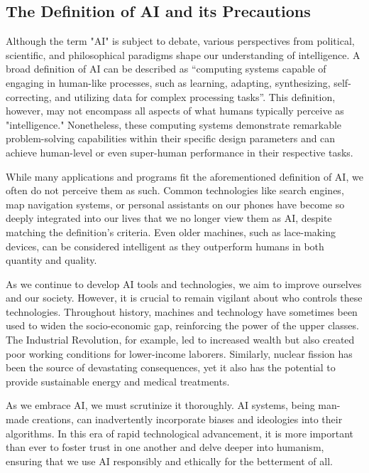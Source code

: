 \documentclass[letterpaper, 10pt, conference]{ieeeconf}
\begin{document}
    \subsection{The Definition of AI and its Precautions}
        Although the term "AI" is subject to debate, various perspectives from political, scientific, and philosophical paradigms shape our understanding of intelligence. A broad definition of AI can be described as 
        \enquote{computing systems capable of engaging in human-like processes, such as learning, adapting, synthesizing, self-correcting, and utilizing data for complex processing tasks}\cite{popenici2017}.
        This definition, however, may not encompass all aspects of what humans typically perceive as "intelligence." Nonetheless, these computing systems demonstrate remarkable problem-solving capabilities within their specific design parameters and can achieve human-level or even super-human performance in their respective tasks.

        While many applications and programs fit the aforementioned definition of AI, we often do not perceive them as such. Common technologies like search engines, map navigation systems, or personal assistants on our phones have become so deeply integrated into our lives that we no longer view them as AI, despite matching the definition's criteria. Even older machines, such as lace-making devices, can be considered intelligent as they outperform humans in both quantity and quality.

        As we continue to develop AI tools and technologies, we aim to improve ourselves and our society. However, it is crucial to remain vigilant about who controls these technologies. Throughout history, machines and technology have sometimes been used to widen the socio-economic gap, reinforcing the power of the upper classes. The Industrial Revolution, for example, led to increased wealth but also created poor working conditions for lower-income laborers. Similarly, nuclear fission has been the source of devastating consequences, yet it also has the potential to provide sustainable energy and medical treatments.

        As we embrace AI, we must scrutinize it thoroughly. AI systems, being man-made creations, can inadvertently incorporate biases and ideologies into their algorithms. In this era of rapid technological advancement, it is more important than ever to foster trust in one another and delve deeper into humanism, ensuring that we use AI responsibly and ethically for the betterment of all.
\end{document}
